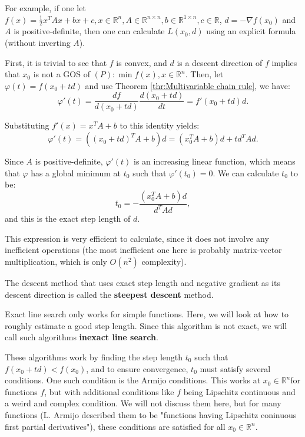For example, if one let \( f(x) = \frac{1}{2}x^{T}Ax + bx + c, x \in
\mathbb{R}^{n}, A \in \mathbb{R}^{n\times n}, b \in \mathbb{R}^{1\times n}, c
\in \mathbb{R} \), \( d = -\nabla f(x_{0}) \) and \( A \) is positive-definite,
then one can calculate \( L(x_{0}, d) \) using an explicit formula (without
inverting \( A \)).

First, it is trivial to see that \( f \) is convex, and \( d \) is a descent
direction of \( f \) implies that \( x_{0} \) is not a GOS of \( (P): \min f(x),
x \in \mathbb{R}^{n}\). Then, let \( \varphi(t) = f(x_{0} + t d) \) and use
Theorem \ref{thr:Multivariable chain rule}, we have:
\[
  \varphi'(t) = \frac{df}{d(x_{0} + t d)} \frac{d(x_{0} + t d)}{dt} = f'(x_{0} +
  t d)d
.\]

Substituting \( f'(x) = x^{T}A + b \) to this identity yields:
\[
  \varphi'(t) = ((x_{0}+t d)^{T}A + b)d = (x_{0}^{T}A + b)d + td^{T}Ad
.\] 

Since \( A \) is positive-definite, \( \varphi'(t) \) is an increasing linear
function, which means that \( \varphi \) has a global minimum at \( t_{0} \)
such that \( \varphi'(t_{0}) = 0 \). We can calculate \( t_{0} \) to be:
\[
  t_{0} = -\frac{(x_{0}^{T}A + b)d}{d^{T}Ad}
,\] and this is the exact step length of \( d \).

This expression is very efficient to calculate, since it does not involve any
inefficient operations (the most inefficient one here is probably matrix-vector
multiplication, which is only \( O(n^2) \) complexity).

The descent method that uses exact step length and negative gradient as its
descent direction is called the \textbf{steepest descent} method.

Exact line search only works for simple functions. Here, we will look at how to
roughly estimate a good step length. Since this algorithm is not exact, we will
call such algorithms \textbf{inexact line search}.

These algorithms work by finding the step length \( t_{0} \) such that \(
f(x_{0} + t d) < f(x_{0}) \), and to ensure convergence, \( t_{0} \) must
satisfy several conditions. One such condition is the Armijo conditions. This
works at \( x_{0} \in \mathbb{R}^{n} \)for functions \( f \), but with
additional conditions like \( f \) being Lipschitz continuous and a weird and
complex condition. We will not discuss them here, but for many functions (L.
Armijo described them to be "functions having Lipschitz coninuous first partial
derivatives"), these conditions are satisfied for all \( x_{0} \in
\mathbb{R}^{n} \).

